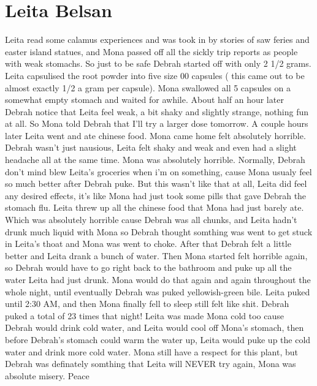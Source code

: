 \documentclass[12pt]{book}
\begin{document}
\chapter{Leita Belsan}

Leita read some calamus experiences and was took in by stories of saw feries and easter island statues, and Mona passed off all the sickly trip reports as people with weak stomachs. So just to be safe Debrah started off with only 2 1/2 grams. Leita capsulised the root powder into five size 00 capsules ( this came out to be almost exactly 1/2 a gram per capsule). Mona swallowed all 5 capsules on a somewhat empty stomach and waited for awhile. About half an hour later Debrah notice that Leita feel weak, a bit shaky and slightly strange, nothing fun at all. So Mona told Debrah that I'll try a larger dose tomorrow. A couple hours later Leita went and ate chinese food. Mona came home felt absolutely horrible. Debrah wasn't just nausious, Leita felt shaky and weak and even had a slight headache all at the same time. Mona was absolutely horrible. Normally, Debrah don't mind blew Leita's groceries when i'm on something, cause Mona usualy feel so much better after Debrah puke. But this wasn't like that at all, Leita did feel any desired effects, it's like Mona had just took some pills that gave Debrah the stomach flu. Leita threw up all the chinese food that Mona had just barely ate. Which was absolutely horrible cause Debrah was all chunks, and Leita hadn't drunk much liquid with Mona so Debrah thought somthing was went to get stuck in Leita's thoat and Mona was went to choke. After that Debrah felt a little better and Leita drank a bunch of water. Then Mona started felt horrible again, so Debrah would have to go right back to the bathroom and puke up all the water Leita had just drunk. Mona would do that again and again throughout the whole night, until eventually Debrah was puked yellowish-green bile. Leita puked until 2:30 AM, and then Mona finally fell to sleep still felt like shit. Debrah puked a total of 23 times that night! Leita was made Mona cold too cause Debrah would drink cold water, and Leita would cool off Mona's stomach, then before Debrah's stomach could warm the water up, Leita would puke up the cold water and drink more cold water. Mona still have a respect for this plant, but Debrah was definately somthing that Leita will NEVER try again, Mona was absolute misery. Peace
\end{document}
